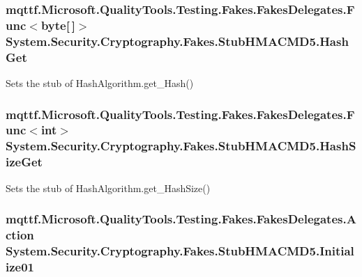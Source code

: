 \hypertarget{class_system_1_1_security_1_1_cryptography_1_1_fakes_1_1_stub_h_m_a_c_m_d5_a23117d92264c135054bc824d873eb2f0}{
\subsubsection[{Hash\-Get}]{\setlength{\rightskip}{0pt plus 5cm}mqttf.\-Microsoft.\-Quality\-Tools.\-Testing.\-Fakes.\-Fakes\-Delegates.\-Func$<$byte\mbox{[}$\,$\mbox{]}$>$ System.\-Security.\-Cryptography.\-Fakes.\-Stub\-H\-M\-A\-C\-M\-D5.\-Hash\-Get}}\label{class_system_1_1_security_1_1_cryptography_1_1_fakes_1_1_stub_h_m_a_c_m_d5_a23117d92264c135054bc824d873eb2f0}


Sets the stub of Hash\-Algorithm.\-get\-\_\-\-Hash()

\hypertarget{class_system_1_1_security_1_1_cryptography_1_1_fakes_1_1_stub_h_m_a_c_m_d5_a80127040773caf6087684a9dd3cf20f1}{
\subsubsection[{Hash\-Size\-Get}]{\setlength{\rightskip}{0pt plus 5cm}mqttf.\-Microsoft.\-Quality\-Tools.\-Testing.\-Fakes.\-Fakes\-Delegates.\-Func$<$int$>$ System.\-Security.\-Cryptography.\-Fakes.\-Stub\-H\-M\-A\-C\-M\-D5.\-Hash\-Size\-Get}}\label{class_system_1_1_security_1_1_cryptography_1_1_fakes_1_1_stub_h_m_a_c_m_d5_a80127040773caf6087684a9dd3cf20f1}


Sets the stub of Hash\-Algorithm.\-get\-\_\-\-Hash\-Size()

\hypertarget{class_system_1_1_security_1_1_cryptography_1_1_fakes_1_1_stub_h_m_a_c_m_d5_a114c9795a4eba3f4e8a15b299a3f5715}{
\subsubsection[{Initialize01}]{\setlength{\rightskip}{0pt plus 5cm}mqttf.\-Microsoft.\-Quality\-Tools.\-Testing.\-Fakes.\-Fakes\-Delegates.\-Action System.\-Security.\-Cryptography.\-Fakes.\-Stub\-H\-M\-A\-C\-M\-D5.\-Initialize01}}\label{class_system_1_1_security_1_1_cryptography_1_1_fakes_1_1_stub_h_m_a_c_m_d5_a114c9795a4eba3f4e8a15b299a3f5715}


